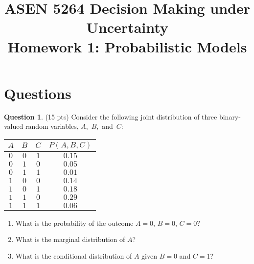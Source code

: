 \documentclass{article}
\title{ASEN 5264 Decision Making under Uncertainty\\
       Homework 1: Probabilistic Models}
\theoremstyle{definition}
\newtheorem{question}[thm]{Question}
\begin{document}
\maketitle

\section{Questions}

\begin{question} (15 pts)
    Consider the following joint distribution of three binary-valued random variables, \mbox{$A$, $B$, and $C$}:

    \begin{minipage}{0.3\linewidth}
        \vspace{1em}
    {\small
    \begin{tabular}{cccc}
        \toprule
            $A$ & $B$ & $C$ & $P(A,B,C)$ \\
        \midrule
            $0$ & $0$ & $1$ & $0.15$ \\
            $0$ & $1$ & $0$ & $0.05$ \\
            $0$ & $1$ & $1$ & $0.01$ \\
            $1$ & $0$ & $0$ & $0.14$ \\
            $1$ & $0$ & $1$ & $0.18$ \\
            $1$ & $1$ & $0$ & $0.29$ \\
            $1$ & $1$ & $1$ & $0.06$ \\
        \bottomrule
    \end{tabular}
    }
    \end{minipage}
    \begin{minipage}{0.7\linewidth}
        \begin{enumerate}[label=\alph*)]
            \item What is the probability of the outcome $A=0$, $B=0$, $C=0$?
            \item What is the marginal distribution of $A$?
            \item What is the conditional distribution of $A$ given $B=0$ and $C=1$?
        \end{enumerate}
    \end{minipage}
\end{question}
\end{document}
